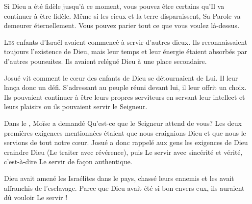 Si Dieu a été fidèle jusqu'à ce moment, vous pouvez être certains
 qu'Il va continuer à être fidèle. Même si les cieux et la terre disparaissent,
 Sa Parole va demeurer éternellement.
 Vous pouvez parier tout ce que vous voulez là-dessus. 

\dvrule







\lettrine{L}{es} enfants d'Israël avaient commencé à servir d'autres dieux.
 Ils reconnaissaient toujours l'existence de Dieu, mais leur temps
 et leur énergie étaient absorbés par d'autres poursuites.
 Ils avaient relégué Dieu à une place secondaire.

Josué vit comment le c\oe{}ur des enfants de Dieu se détournaient de Lui.
 Il leur lan\c{c}a donc un défi. S'adressant au peuple réuni devant lui,
 il leur offrit un choix. Ils pouvaient continuer à être
 leurs propres serviteurs
 \ocadr en servant leur intellect et leurs plaisirs \fcadr{}
 ou ils pouvaient servir le Seigneur.


Dans le , Moïse a demandé\frcolon{}
 \Og Qu'est-ce que le Seigneur attend de vous? \Fg{}
 Les deux premières exigences mentionnées
 étaient que nous craignions Dieu et que nous le servions de tout notre c\oe{}ur.
 Josué a donc rappelé aux gens les exigences de Dieu\frcolon{}
 craindre Dieu (Le traiter avec révérence),
 puis Le servir avec sincérité et vérité,
 c'est-à-dire Le servir de fa\c{c}on authentique.

Dieu avait amené les Israélites dans le pays,
 chassé leurs ennemis et les avait affranchis de l'esclavage.
 Parce que Dieu avait été si bon envers eux, ils auraient dû vouloir Le servir !

